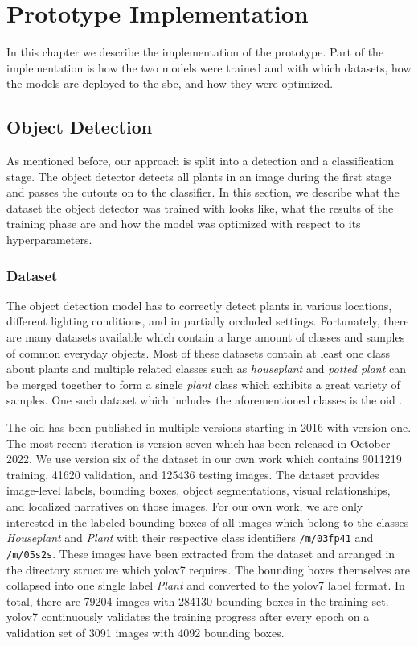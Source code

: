 \documentclass[final]{vutinfth} %
\begin{document}
\chapter{Prototype Implementation}
\label{chap:implementation}

In this chapter we describe the implementation of the prototype. Part
of the implementation is how the two models were trained and with
which datasets, how the models are deployed to the \gls{sbc}, and how
they were optimized.

\section{Object Detection}
\label{sec:development-detection}

As mentioned before, our approach is split into a detection and a
classification stage. The object detector detects all plants in an
image during the first stage and passes the cutouts on to the
classifier. In this section, we describe what the dataset the object
detector was trained with looks like, what the results of the training
phase are and how the model was optimized with respect to its
hyperparameters.

\subsection{Dataset}
\label{ssec:obj-train-dataset}

The object detection model has to correctly detect plants in various
locations, different lighting conditions, and in partially occluded
settings. Fortunately, there are many datasets available which
contain a large amount of classes and samples of common everyday
objects. Most of these datasets contain at least one class about
plants and multiple related classes such as \emph{houseplant} and
\emph{potted plant} can be merged together to form a single
\emph{plant} class which exhibits a great variety of samples. One such
dataset which includes the aforementioned classes is the \gls{oid}
\cite{kuznetsova2020,krasin2017}.

The \gls{oid} has been published in multiple versions starting in 2016
with version one. The most recent iteration is version seven which has
been released in October 2022. We use version six of the dataset in
our own work which contains \num{9011219} training, \num{41620}
validation, and \num{125436} testing images. The dataset provides
image-level labels, bounding boxes, object segmentations, visual
relationships, and localized narratives on those images. For our own
work, we are only interested in the labeled bounding boxes of all
images which belong to the classes \emph{Houseplant} and \emph{Plant}
with their respective class identifiers \texttt{/m/03fp41} and
\texttt{/m/05s2s}. These images have been extracted from the dataset
and arranged in the directory structure which \gls{yolo}v7
requires. The bounding boxes themselves are collapsed into one single
label \emph{Plant} and converted to the \gls{yolo}v7 label format. In
total, there are \num{79204} images with \num{284130} bounding boxes
in the training set. \gls{yolo}v7 continuously validates the training
progress after every epoch on a validation set of \num{3091} images
with \num{4092} bounding boxes.
\end{document}

